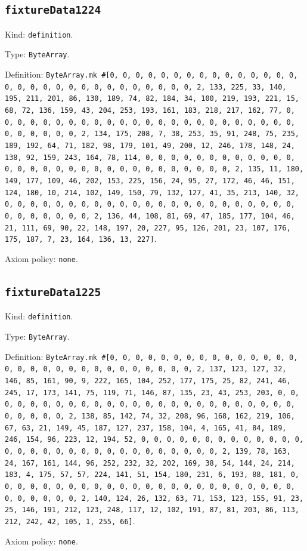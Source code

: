 \documentclass[11pt]{article}
\begin{document}
\subsection*{\texttt{fixtureData1224}}
\noindent Kind: \texttt{definition}.\par
\noindent Type: \texttt{ByteArray}.\par
\noindent Definition: \texttt{ByteArray.mk \#[0, 0, 0, 0, 0, 0, 0, 0, 0, 0, 0, 0, 0, 0, 0, 0, 0, 0, 0, 0, 0, 0, 0, 0, 0, 0, 0, 0, 0, 0, 2, 133, 225, 33, 140, 195, 211, 201, 86, 130, 189, 74, 82, 184, 34, 100, 219, 193, 221, 15, 68, 72, 136, 159, 43, 204, 253, 193, 161, 183, 218, 217, 162, 77, 0, 0, 0, 0, 0, 0, 0, 0, 0, 0, 0, 0, 0, 0, 0, 0, 0, 0, 0, 0, 0, 0, 0, 0, 0, 0, 0, 0, 0, 0, 2, 134, 175, 208, 7, 38, 253, 35, 91, 248, 75, 235, 189, 192, 64, 71, 182, 98, 179, 101, 49, 200, 12, 246, 178, 148, 24, 138, 92, 159, 243, 164, 78, 114, 0, 0, 0, 0, 0, 0, 0, 0, 0, 0, 0, 0, 0, 0, 0, 0, 0, 0, 0, 0, 0, 0, 0, 0, 0, 0, 0, 0, 0, 0, 2, 135, 11, 180, 149, 177, 109, 46, 202, 153, 225, 156, 24, 95, 27, 172, 46, 46, 151, 124, 180, 10, 214, 102, 149, 150, 79, 132, 127, 41, 35, 213, 140, 32, 0, 0, 0, 0, 0, 0, 0, 0, 0, 0, 0, 0, 0, 0, 0, 0, 0, 0, 0, 0, 0, 0, 0, 0, 0, 0, 0, 0, 0, 0, 2, 136, 44, 108, 81, 69, 47, 185, 177, 104, 46, 21, 111, 69, 90, 22, 148, 197, 20, 227, 95, 126, 201, 23, 107, 176, 175, 187, 7, 23, 164, 136, 13, 227]}.\par
\noindent Axiom policy: \texttt{none}.\par
\subsection*{\texttt{fixtureData1225}}
\noindent Kind: \texttt{definition}.\par
\noindent Type: \texttt{ByteArray}.\par
\noindent Definition: \texttt{ByteArray.mk \#[0, 0, 0, 0, 0, 0, 0, 0, 0, 0, 0, 0, 0, 0, 0, 0, 0, 0, 0, 0, 0, 0, 0, 0, 0, 0, 0, 0, 0, 0, 2, 137, 123, 127, 32, 146, 85, 161, 90, 9, 222, 165, 104, 252, 177, 175, 25, 82, 241, 46, 245, 17, 173, 141, 75, 119, 71, 146, 87, 135, 23, 43, 253, 203, 0, 0, 0, 0, 0, 0, 0, 0, 0, 0, 0, 0, 0, 0, 0, 0, 0, 0, 0, 0, 0, 0, 0, 0, 0, 0, 0, 0, 0, 0, 2, 138, 85, 142, 74, 32, 208, 96, 168, 162, 219, 106, 67, 63, 21, 149, 45, 187, 127, 237, 158, 104, 4, 165, 41, 84, 189, 246, 154, 96, 223, 12, 194, 52, 0, 0, 0, 0, 0, 0, 0, 0, 0, 0, 0, 0, 0, 0, 0, 0, 0, 0, 0, 0, 0, 0, 0, 0, 0, 0, 0, 0, 0, 0, 2, 139, 78, 163, 24, 167, 161, 144, 96, 252, 232, 32, 202, 169, 38, 54, 144, 24, 214, 183, 4, 175, 57, 57, 224, 141, 51, 154, 180, 231, 6, 193, 88, 181, 0, 0, 0, 0, 0, 0, 0, 0, 0, 0, 0, 0, 0, 0, 0, 0, 0, 0, 0, 0, 0, 0, 0, 0, 0, 0, 0, 0, 0, 0, 2, 140, 124, 26, 132, 63, 71, 153, 123, 155, 91, 23, 25, 146, 191, 212, 123, 248, 117, 12, 102, 191, 87, 81, 203, 86, 113, 212, 242, 42, 105, 1, 255, 66]}.\par
\noindent Axiom policy: \texttt{none}.\par
\end{document}
